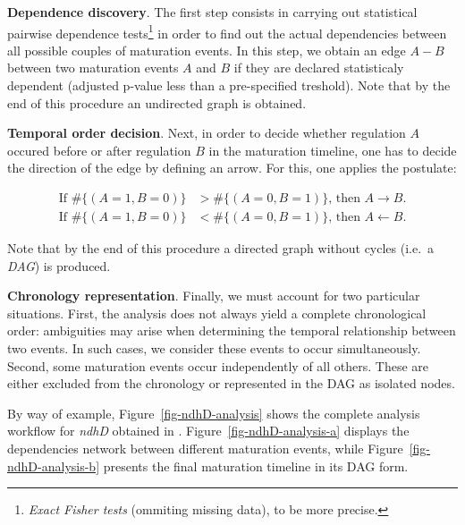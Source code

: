 \documentclass[
]{article}
\theoremstyle{definition}
\theoremstyle{remark}
\begin{document}
\textbf{Dependence discovery}. The first step consists in carrying out
statistical pairwise dependence tests\footnote{\emph{Exact Fisher tests}
  (ommiting missing data), to be more precise.} in order to find out the
actual dependencies between all possible couples of maturation events.
In this step, we obtain an edge \(A - B\) between two maturation events
\(A\) and \(B\) if they are declared statisticaly dependent (adjusted
p-value less than a pre-specified treshold). Note that by the end of
this procedure an undirected graph is obtained.

\textbf{Temporal order decision}. Next, in order to decide whether
regulation \(A\) occured before or after regulation \(B\) in the
maturation timeline, one has to decide the direction of the edge by
defining an arrow. For this, one applies the postulate:

\begin{align*}
\text{If } \#\{(A=1, B=0)\} &> \#\{(A=0, B=1)\}\text{, then } A\rightarrow B.\\
\text{If } \#\{(A=1, B=0)\} &< \#\{(A=0, B=1)\}\text{, then } A\leftarrow B.
\end{align*}

Note that by the end of this procedure a directed graph without cycles
(i.e.~a \emph{DAG}) is produced.

\textbf{Chronology representation}. Finally, we must account for two
particular situations. First, the analysis does not always yield a
complete chronological order: ambiguities may arise when determining the
temporal relationship between two events. In such cases, we consider
these events to occur simultaneously. Second, some maturation events
occur independently of all others. These are either excluded from the
chronology or represented in the DAG as isolated nodes.

By way of example, Figure~\ref{fig-ndhD-analysis} shows the complete
analysis workflow for \emph{ndhD} obtained in
.
Figure~\ref{fig-ndhD-analysis-a} displays the dependencies network
between different maturation events, while
Figure~\ref{fig-ndhD-analysis-b} presents the final maturation timeline
in its DAG form.
\end{document}
